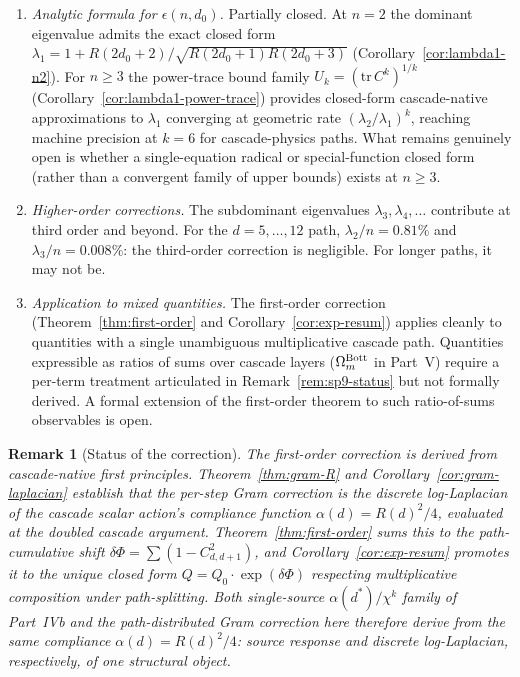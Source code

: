 \documentclass[11pt,a4paper]{article}
\newtheorem{remark}[theorem]{Remark}
\begin{document}
\begin{enumerate}
\item \emph{Analytic formula for $\epsilon(n, d_0)$.} Partially closed. At $n = 2$ the dominant eigenvalue admits the exact closed form $\lambda_1 = 1 + R(2d_0+2)/\sqrt{R(2d_0+1)R(2d_0+3)}$ (Corollary~\ref{cor:lambda1-n2}). For $n \geq 3$ the power-trace bound family $U_k = (\mathrm{tr}\,C^k)^{1/k}$ (Corollary~\ref{cor:lambda1-power-trace}) provides closed-form cascade-native approximations to $\lambda_1$ converging at geometric rate $(\lambda_2/\lambda_1)^k$, reaching machine precision at $k = 6$ for cascade-physics paths. What remains genuinely open is whether a single-equation radical or special-function closed form (rather than a convergent family of upper bounds) exists at $n \geq 3$.
\item \emph{Higher-order corrections.} The subdominant eigenvalues $\lambda_3, \lambda_4, \ldots$ contribute at third order and beyond. For the $d = 5, \ldots, 12$ path, $\lambda_2/n = 0.81\%$ and $\lambda_3/n = 0.008\%$: the third-order correction is negligible. For longer paths, it may not be.
\item \emph{Application to mixed quantities.} The first-order correction (Theorem~\ref{thm:first-order} and Corollary~\ref{cor:exp-resum}) applies cleanly to quantities with a single unambiguous multiplicative cascade path. Quantities expressible as ratios of sums over cascade layers ($\Omega_m^{\rm Bott}$ in Part~V) require a per-term treatment articulated in Remark~\ref{rem:sp9-status} but not formally derived. A formal extension of the first-order theorem to such ratio-of-sums observables is open.
\end{enumerate}

\begin{remark}[Status of the correction]
The first-order correction is derived from cascade-native first principles. Theorem~\ref{thm:gram-R} and Corollary~\ref{cor:gram-laplacian} establish that the per-step Gram correction is the discrete log-Laplacian of the cascade scalar action's compliance function $\alpha(d)=R(d)^2/4$, evaluated at the doubled cascade argument. Theorem~\ref{thm:first-order} sums this to the path-cumulative shift $\delta\Phi=\sum(1-C^2_{d,d+1})$, and Corollary~\ref{cor:exp-resum} promotes it to the unique closed form $Q = Q_0\cdot\exp(\delta\Phi)$ respecting multiplicative composition under path-splitting. Both single-source $\alpha(d^*)/\chi^k$ family of Part~IVb and the path-distributed Gram correction here therefore derive from the same compliance $\alpha(d)=R(d)^2/4$: source response and discrete log-Laplacian, respectively, of one structural object.
\end{remark}
\end{document}
